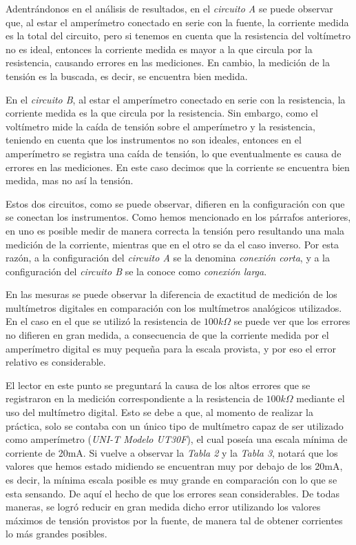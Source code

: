 \documentclass{article}
\begin{document}
	Adentrándonos en el análisis de resultados, en el \textit{circuito A} se puede observar que, al estar el amperímetro conectado en serie con la fuente, la corriente medida es la total del circuito, pero si tenemos en cuenta que la resistencia del voltímetro no es ideal, entonces la corriente medida es mayor a la que circula por la resistencia, causando errores en las mediciones. En cambio, la medición de la tensión es la buscada, es decir, se encuentra bien medida.
	\par
	En el \textit{circuito B}, al estar el amperímetro conectado en serie con la resistencia, la corriente medida es la que circula por la resistencia. Sin embargo, como el voltímetro mide la caída de tensión sobre el amperímetro y la resistencia, teniendo en cuenta que los instrumentos no son ideales, entonces en el amperímetro se registra una caída de tensión, lo que eventualmente es causa de errores en las mediciones. En este caso decimos que la corriente se encuentra bien medida, mas no así la tensión.
	\par
	Estos dos circuitos, como se puede observar, difieren en la configuración con que se conectan los instrumentos. Como hemos mencionado en los párrafos anteriores, en uno es posible medir de manera correcta la tensión pero resultando una mala medición de la corriente, mientras que en el otro se da el caso inverso. Por esta razón, a la configuración del \textit{circuito A} se la denomina \textit{conexión corta}, y a la configuración del \textit{circuito B} se la conoce como \textit{conexión larga}.
	\par
	En las mesuras se puede observar la diferencia de exactitud de medición de los multímetros digitales en comparación con los multímetros analógicos utilizados. En el caso en el que se utilizó la resistencia de $100k\Omega$ se puede ver que los errores no difieren en gran medida, a consecuencia de que la corriente medida por el amperímetro digital es muy pequeña para la escala provista, y por eso el error relativo es considerable.
	\par
	El lector en este punto se preguntará la causa de los altos errores que se registraron en la medición correspondiente a la resistencia de $100k\Omega$ mediante el uso del multímetro digital. Esto se debe a que, al momento de realizar la práctica, solo se contaba con un único tipo de multímetro capaz de ser utilizado como amperímetro (\textit{UNI-T Modelo UT30F}), el cual poseía una escala mínima de corriente de 20mA. Si  vuelve a observar la \textit{Tabla 2} y la \textit{Tabla 3}, notará que los valores que hemos estado midiendo se encuentran muy por debajo de los 20mA, es decir, la mínima escala posible es muy grande en comparación con lo que se esta sensando. De aquí el hecho de que los errores sean considerables. De todas maneras, se logró reducir en gran medida dicho error utilizando los valores máximos de tensión provistos por la fuente, de manera tal de obtener corrientes lo más grandes posibles.
\bigskip\bigskip
\end{document}

